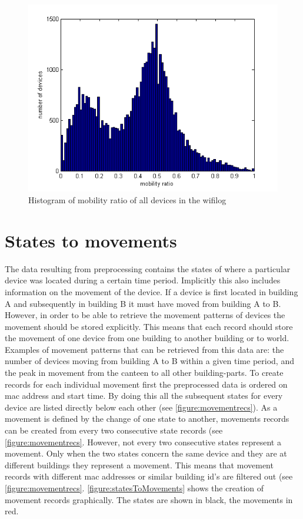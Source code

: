 \begin{figure}[H]
\centering
\includegraphics[scale=0.7]{mobility.png}
\captionsetup{justification=centering}
\caption{Histogram of mobility ratio of all devices in the wifilog}
\label{figure:mobility}
\end{figure}

\section{States to movements}\label{statesToMovements}
The data resulting from preprocessing contains the states of where a particular device was located during a certain time period. Implicitly this also includes information on the movement of the device. If a device is first located in building A and subsequently in building B it must have moved from building A to B. However, in order to be able to retrieve the movement patterns of devices the movement should be stored explicitly. This means that each record should store the movement of one device from one building to another building or to world. Examples of movement patterns that can be retrieved from this data are: the number of devices moving from building A to B within a given time period, and the peak in movement from the canteen to all other building-parts. 
To create records for each individual movement first the preprocessed data is ordered on mac address and start time. By doing this all the subsequent states for every device are listed directly below each other (see \autoref{figure:movementrecs}). As a movement is defined by the change of one state to another, movements records can be created from every two consecutive state records (see \autoref{figure:movementrecs}. However, not every two consecutive states represent a movement. Only when the two states concern the same device and they are at different buildings they represent a movement. This means that movement records with different mac addresses or similar building id’s are filtered out (see \autoref{figure:movementrecs}. \autoref{figure:statesToMovements} shows the creation of movement records graphically. The states are shown in black, the movements in red.

